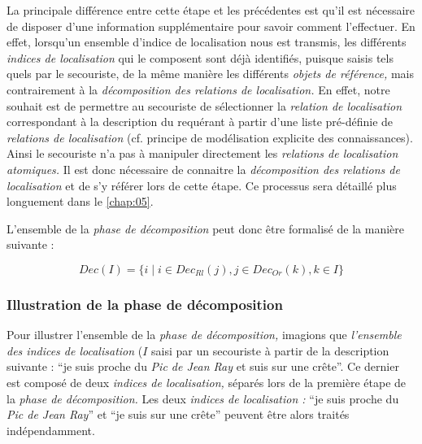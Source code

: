 La principale différence entre cette étape et les
précédentes est qu'il est nécessaire de disposer d'une information
supplémentaire pour savoir comment l'effectuer. En effet, lorsqu'un
ensemble d'indice de localisation nous est transmis, les différents
\emph{indices de localisation} qui le composent sont déjà identifiés,
puisque saisis tels quels par le secouriste, de la même manière les
différents \emph{objets de référence,} mais contrairement à la
\emph{décomposition des relations de localisation.} En effet, notre
souhait est de permettre au secouriste de sélectionner la
\emph{relation de localisation} correspondant à la description du
requérant à partir d'une liste pré-définie de \emph{relations de
  localisation} (cf. principe de modélisation explicite des
connaissances). Ainsi le secouriste n'a pas à manipuler directement
les \emph{relations de localisation atomiques.} Il est donc nécessaire
de connaitre la \emph{décomposition des relations de localisation} et
de s'y référer lors de cette étape. Ce processus sera détaillé plus
longuement dans le \autoref{chap:05}.


L'ensemble de la \emph{phase de décomposition} peut donc être
formalisé de la manière suivante :

\begin{equation}
  Dec(I) = \{ i \mid i \in Dec_{Rl}(j), j \in  Dec_{Or}(k), k \in I\} 
\end{equation}


\subsubsection{Illustration de la phase de décomposition}

Pour illustrer l'ensemble de la \emph{phase de décomposition,}
imagions que \emph{l'ensemble des indices de localisation} (\(I\)
saisi par un secouriste à partir de la description suivante :
\enquote{je suis proche du \emph{Pic de Jean Ray} et suis sur une
  crête}. Ce dernier est composé de deux \emph{indices de
  localisation,} séparés lors de la première étape de la \emph{phase
  de décomposition.} Les deux \emph{indices de localisation :}
\enquote{je suis proche du \emph{Pic de Jean Ray}} et \enquote{je suis
  sur une crête} peuvent être alors traités indépendamment.

\begin{quote}
\end{quote}


